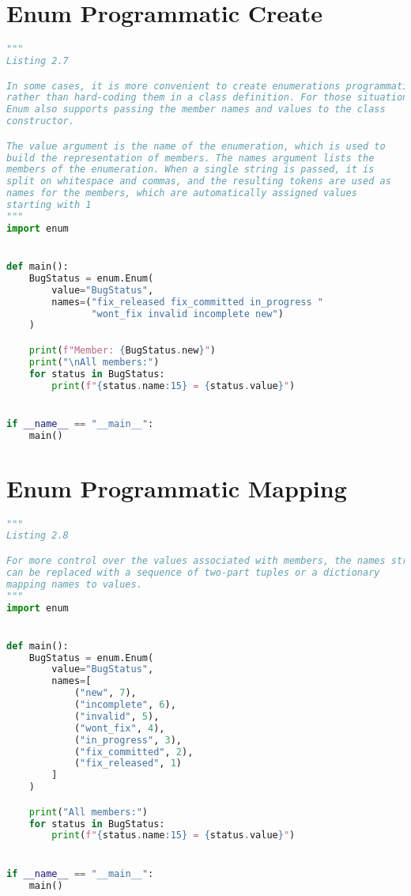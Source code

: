 \documentclass[a4paper,landscape]{report}
\begin{document}
\section{Enum Programmatic Create}
\begin{lstlisting}[language=Python]
"""
Listing 2.7

In some cases, it is more convenient to create enumerations programmatically,
rather than hard-coding them in a class definition. For those situations,
Enum also supports passing the member names and values to the class
constructor.

The value argument is the name of the enumeration, which is used to
build the representation of members. The names argument lists the
members of the enumeration. When a single string is passed, it is
split on whitespace and commas, and the resulting tokens are used as
names for the members, which are automatically assigned values
starting with 1
"""
import enum


def main():
    BugStatus = enum.Enum(
        value="BugStatus",
        names=("fix_released fix_committed in_progress "
               "wont_fix invalid incomplete new")
    )

    print(f"Member: {BugStatus.new}")
    print("\nAll members:")
    for status in BugStatus:
        print(f"{status.name:15} = {status.value}")


if __name__ == "__main__":
    main()

\end{lstlisting}
\section{Enum Programmatic Mapping}
\begin{lstlisting}[language=Python]
"""
Listing 2.8

For more control over the values associated with members, the names string
can be replaced with a sequence of two-part tuples or a dictionary
mapping names to values.
"""
import enum


def main():
    BugStatus = enum.Enum(
        value="BugStatus",
        names=[
            ("new", 7),
            ("incomplete", 6),
            ("invalid", 5),
            ("wont_fix", 4),
            ("in_progress", 3),
            ("fix_committed", 2),
            ("fix_released", 1)
        ]
    )

    print("All members:")
    for status in BugStatus:
        print(f"{status.name:15} = {status.value}")


if __name__ == "__main__":
    main()

\end{lstlisting}
\end{document}
